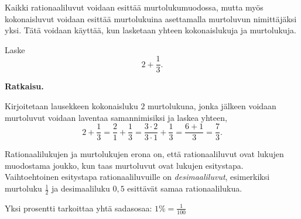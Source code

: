    Kaikki rationaaliluvut voidaan esittää murtolukumuodossa, mutta myös
    kokonaisluvut voidaan esittää murtolukuina asettamalla murtoluvun
    nimittäjäksi yksi. Tätä voidaan käyttää, kun lasketaan yhteen
    kokonaislukuja ja murtolukuja.
    
    \begin{esimerkki}
        Laske
        \[
            2 + \frac{1}{3}.
        \]
        
        \textbf{Ratkaisu.}
        
		Kirjoitetaan lausekkeen kokonaisluku $2$ murtolukuna, jonka
		jälkeen voidaan murtoluvut voidaan laventaa samannimisiksi
		ja laskea yhteen,
        \[
            2 + \frac{1}{3} =
            \frac{2}{1} + \frac{1}{3} =
            \frac{3 \cdot 2}{3 \cdot 1} + \frac{1}{3} =
            \frac{6+1}{3} =
            \frac{7}{3}.
        \]
    \end{esimerkki}
    
    Rationaalilukujen ja murtolukujen erona on, että rationaaliluvut
    ovat lukujen muodostama joukko, kun taas murtoluvut ovat lukujen esitystapa.
    Vaihtoehtoinen esitystapa rationaaliluvuille on \emph{desimaaliluvut},
    esimerkiksi murtoluku $\frac{1}{2}$ ja desimaaliluku $0,5$
    esittävät samaa rationaalilukua.
    
    
    Yksi prosentti tarkoittaa yhtä sadasosaa: $1 \% = \frac{1}{100}$
    
